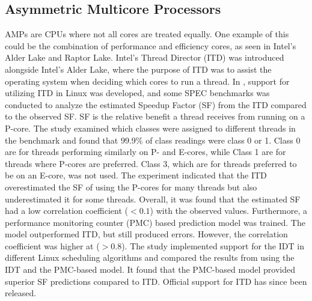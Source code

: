 \subsection{Asymmetric Multicore Processors}
AMPs are CPUs where not all cores are treated equally. One example of this could be the combination of performance and efficiency cores, as seen in Intel's Alder Lake and Raptor Lake. Intel's Thread Director (ITD) was introduced alongside Intel's Alder Lake, where the purpose of ITD was to assist the operating system when deciding which cores to run a thread.
In \cite{saez2022evaluation}, support for utilizing ITD in Linux was developed, and some SPEC benchmarks was conducted to analyze the estimated Speedup Factor (SF) from the ITD compared to the observed SF. SF is the relative benefit a thread receives from running on a P-core. The study examined which classes were assigned to different threads in the benchmark and found that 99.9\% of class readings were class 0 or 1. Class 0 are for threads performing similarly on P- and E-cores, while Class 1 are for threads where P-cores are preferred.\cite{Intel202?whitepaper} Class 3, which are for threads preferred to be on an E-core, was not used. The experiment indicated that the ITD overestimated the SF of using the P-cores for many threads but also underestimated it for some threads. Overall, it was found that the estimated SF had a low correlation coefficient ($<0.1$) with the observed values. Furthermore, a performance monitoring counter (PMC) based prediction model was trained. The model outperformed ITD, but still produced errors. However, the correlation coefficient was higher at ($>0.8$). The study implemented support for the IDT in different Linux scheduling algorithms and compared the results from using the IDT and the PMC-based model. It found that the PMC-based model provided superior SF predictions compared to ITD.\cite{saez2022evaluation} Official support for ITD has since been released.
